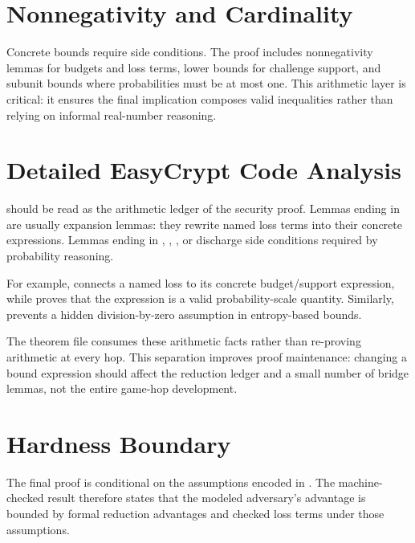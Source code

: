 \section{Nonnegativity and Cardinality}

Concrete bounds require side conditions.  The proof includes nonnegativity
lemmas for budgets and loss terms, lower bounds for challenge support, and
subunit bounds where probabilities must be at most one.  This arithmetic layer
is critical: it ensures the final implication composes valid inequalities rather
than relying on informal real-number reasoning.

\section{Detailed EasyCrypt Code Analysis}

 should be read as the arithmetic ledger of the
security proof.  Lemmas ending in  are usually expansion lemmas: they
rewrite named loss terms into their concrete expressions.  Lemmas ending in
, , , or  discharge
side conditions required by probability reasoning.

For example,  connects a
named loss to its concrete budget/support expression, while
 proves that the expression
is a valid probability-scale quantity.  Similarly,
 prevents a hidden
division-by-zero assumption in entropy-based bounds.

The theorem file  consumes these arithmetic facts
rather than re-proving arithmetic at every hop.  This separation improves proof
maintenance: changing a bound expression should affect the reduction ledger and
a small number of bridge lemmas, not the entire game-hop development.

\section{Hardness Boundary}

The final proof is conditional on the assumptions encoded in
.  The machine-checked result therefore states
that the modeled \haetae{} adversary's advantage is bounded by formal reduction
advantages and checked loss terms under those assumptions.
